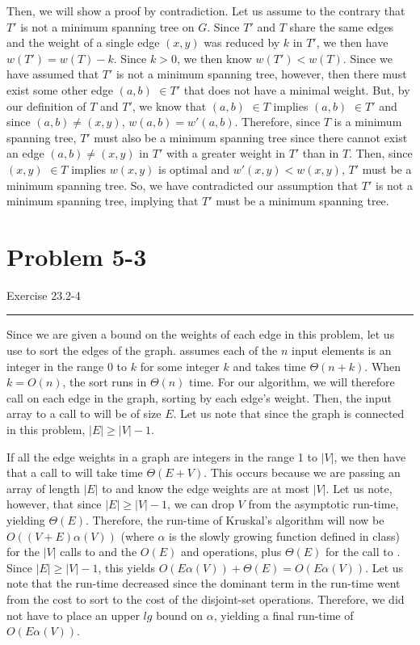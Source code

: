 \documentclass[11pt]{article}
\def\separateline{\medskip\hrule\medskip}
\begin{document}
Then, we will show a proof by contradiction. Let us assume to the contrary that $T'$ is not a minimum spanning tree on $G$. Since $T'$ and $T$ share the same edges and the weight of a single edge $(x,y)$ was reduced by $k$ in $T'$, we then have $w(T') = w(T) - k$. Since $k>0$, we then know $w(T') < w(T)$. Since we have assumed that $T'$ is not a minimum spanning tree, however, then there must exist some other edge $(a,b)$ $\in T'$ that does not have a minimal weight. But, by our definition of $T$ and $T'$, we know that $(a,b)$ $\in T$ implies $(a,b)$ $\in T'$ and since $(a,b) \neq (x,y)$, $w(a,b) = w'(a,b)$. Therefore, since $T$ is a minimum spanning tree, $T'$ must also be a minimum spanning tree since there cannot exist an edge $(a,b) \neq (x,y)$ in $T'$ with a greater weight in $T'$ than in $T$. Then, since $(x,y)$ $\in T$ implies $w(x,y)$ is optimal and $w'(x,y) < w(x,y)$, $T'$ must be a minimum spanning tree. So, we have contradicted our assumption that $T'$ is not a minimum spanning tree, implying that $T'$ must be a minimum spanning tree.

\newpage

\section{Problem 5-3}
Exercise 23.2-4
\separateline

Since we are given a bound on the weights of each edge in this problem, let us use  to sort the edges of the graph.  assumes each of the $n$ input elements is an integer in the range 0 to $k$ for some integer $k$ and takes time $\Theta(n + k)$. When $k = O(n)$, the sort runs in $\Theta(n)$ time. For our algorithm, we will therefore call  on each edge in the graph, sorting by each edge's weight. Then, the input array to a call to  will be of size $E$. Let us note that since the graph is connected in this problem, $|E| \geq |V| - 1$.

If all the edge weights in a graph are integers in the range 1 to $|V|$, we then have that a call to  will take time $\Theta(E + V)$. This occurs because we are passing an array of length $|E|$ to  and know the edge weights are at most $|V|$. Let us note, however, that since $|E| \geq |V| - 1$, we can drop $V$ from the asymptotic run-time, yielding $\Theta(E)$. Therefore, the run-time of Kruskal's algorithm will now be $O((V+E)\alpha(V))$ (where $\alpha$ is the slowly growing function defined in class) for the $|V|$ calls to  and the $O(E)$  and  operations, plus $\Theta(E)$ for the call to . Since $|E| \geq |V| - 1$, this yields $O(E\alpha(V)) + \Theta(E) = O(E\alpha(V))$. Let us note that the run-time decreased since the dominant term in the run-time went from the cost to sort to the cost of the disjoint-set operations. Therefore, we did not have to place an upper $lg$ bound on $\alpha$, yielding a final run-time of $O(E\alpha(V))$.
\end{document}
